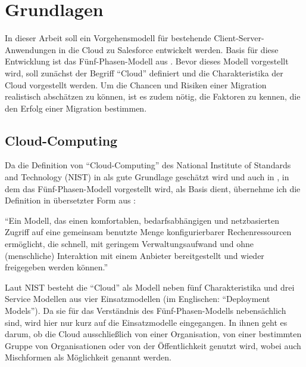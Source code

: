 \section{Grundlagen}







In dieser Arbeit soll ein Vorgehensmodell für bestehende 
Client-Server-Anwendungen in die Cloud zu 
Salesforce entwickelt werden. Basis für diese Entwicklung ist das 
Fünf-Phasen-Modell aus . Bevor dieses Modell vorgestellt 
wird, soll zunächst der Begriff "`Cloud"' definiert und die Charakteristika 
der Cloud vorgestellt werden. Um die Chancen und Risiken einer Migration 
realistisch abschätzen 
zu können, ist es zudem nötig, die Faktoren zu kennen, die den Erfolg einer 
Migration bestimmen. 
\subsection{Cloud-Computing}
Da die Definition von "`Cloud-Computing"' des National Institute of Standards 
and Technology (NIST)  in  als gute 
Grundlage geschätzt wird und auch in , in dem das 
Fünf-Phasen-Modell vorgestellt wird, als Basis dient, übernehme ich die
Definition in übersetzter Form aus :
\begin{cloudcomputing}
"`Ein Modell, das einen komfortablen, bedarfsabhängigen und netzbasierten 
Zugriff auf eine gemeinsam benutzte Menge konfigurierbarer Rechenressourcen 
ermöglicht, die schnell, mit geringem Verwaltungsaufwand und ohne (menschliche) 
Interaktion mit einem Anbieter bereitgestellt und wieder freigegeben werden 
können."'
\end{cloudcomputing}
Laut NIST besteht die "`Cloud"' als Modell neben fünf Charakteristika und drei 
Service Modellen aus vier Einsatzmodellen (im Englischen: "`Deployment 
Models"'). Da sie für das Verständnis des Fünf-Phasen-Modells nebensächlich 
sind, wird hier nur kurz auf die Einsatzmodelle eingegangen. In ihnen geht es 
darum, ob die Cloud ausschließlich von einer Organisation, von einer bestimmten 
Gruppe von Organisationen oder von der Öffentlichkeit genutzt wird, wobei auch 
Mischformen als Möglichkeit genannt werden. 

